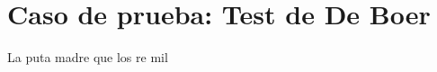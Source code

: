 \documentclass[../informe.tex]{subfiles}
\begin{document}
\section{Caso de prueba: Test de De Boer}
\label{sec:boer}
La puta madre que los re mil
\end{document}
